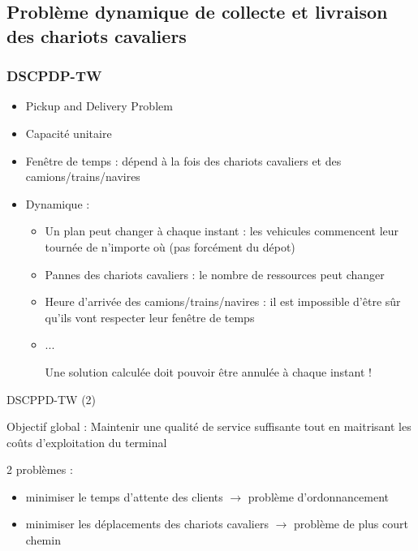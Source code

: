\documentclass{beamer}
\begin{document}
\subsection*{Problème dynamique de collecte et livraison des chariots cavaliers}
\begin{frame}
\frametitle{DSCPDP-TW}
	\begin{itemize}
 		\item Pickup and Delivery Problem
		\item Capacité unitaire
		\item Fenêtre de temps : \small dépend à la fois des chariots cavaliers et des camions/trains/navires\normalsize
		\item Dynamique : 
			   \begin{itemize}
			    \item Un plan peut changer à chaque instant : \small les vehicules commencent leur tournée de n'importe où (pas forcément du dépot)\normalsize
			    \item Pannes des chariots cavaliers : \small le nombre de ressources peut changer\normalsize
			    \item Heure d'arrivée des camions/trains/navires : \small il est impossible d'être sûr qu'ils vont respecter leur fenêtre de temps\normalsize
			    \item ...
			    \begin{center}  Une solution calculée doit pouvoir être annulée à chaque instant ! \end{center}
			    \end{itemize}
	\end{itemize}
\end{frame}
\begin{frame}{DSCPPD-TW (2)}
	\begin{block}{Objectif global :}
	 Maintenir une qualité de service suffisante tout en maitrisant les coûts d'exploitation du terminal
	\end{block}
	\begin{block}{2 problèmes :} 
		\begin{itemize}
		\item \small minimiser le temps d'attente des clients $\rightarrow$ problème d'ordonnancement \normalsize
		\item \small minimiser les déplacements des chariots cavaliers $\rightarrow$ problème de plus court chemin \normalsize
		\end{itemize}
	\end{block}
\end{frame}
\end{document}

